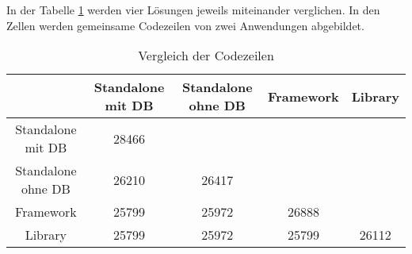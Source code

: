 In der Tabelle \ref{tab:compareLoC} werden vier Lösungen jeweils miteinander verglichen.
In den Zellen werden gemeinsame Codezeilen von zwei Anwendungen abgebildet.

\begin{table}[h!]
    \centering
    \begin{tabular}{|c|c| c| c| c| }
    \hline
                        & Standalone mit DB & Standalone ohne DB    & Framework & Library \\ 
    \hline
    Standalone mit DB   & 28466             &                       &           & \\  
    \hline
    Standalone ohne DB  & 26210             & 26417                 &           & \\  
    \hline
    Framework           & 25799             & 25972                 & 26888     & \\  
    \hline
    Library             & 25799             & 25972                 & 25799     & 26112 \\
    \hline
    \end{tabular}
    \caption{Vergleich der Codezeilen}
    \label{tab:compareLoC}
\end{table}